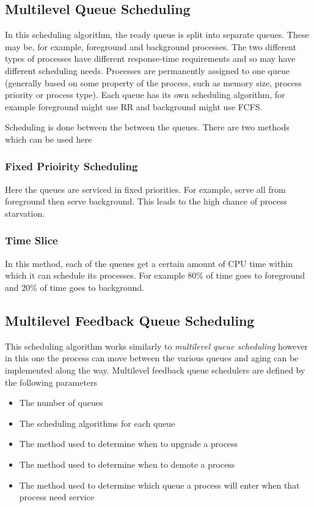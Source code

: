 \subsection{Multilevel Queue Scheduling}
In this scheduling algorithm, the ready queue is split into separate queues. These may be, for example, foreground and background processes. The two different types of processes have different response-time requirements and so may have different scheduling needs. Processes are permanently assigned to one queue (generally based on some property of the process, such as memory size, process priority or process type). Each queue has its own scheduling algorithm, for example foreground might use RR and background might use FCFS. 

Scheduling is done between the between the queues. There are two methods which can be used here
\subsubsection{Fixed Prioirity Scheduling}
Here the queues are serviced in fixed priorities. For example, serve all from foreground then serve background. This leads to the high chance of process starvation. 
\subsubsection{Time Slice}
In this method, each of the queues get a certain amount of CPU time within which it can schedule its processes. For example 80\% of time goes to foreground and 20\% of time goes to background.

\subsection{Multilevel Feedback Queue Scheduling}
This scheduling algorithm works similarly to \textit{multilevel queue scheduling} however in this one the process can move between the various queues and aging can be implemented along the way. Multilevel feedback queue schedulers are defined by the following parameters
\begin{itemize}
    \item The number of queues
    \item The scheduling algorithms for each queue
    \item The method used to determine when to upgrade a process
    \item The method used to determine when to demote a process
    \item The method used to determine which queue a process will enter when that process need service
\end{itemize}
